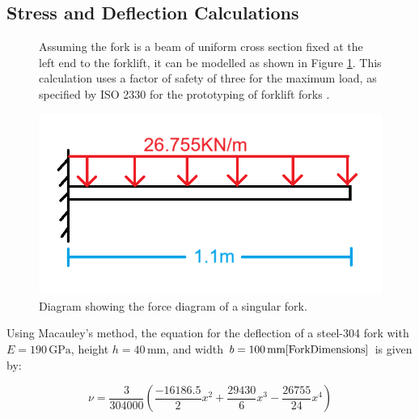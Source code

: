 \documentclass[12pt]{article}
\begin{document}
\subsection {Stress and Deflection Calculations}
\begin{figure}[H]
    \centering
    \begin{minipage}[t]{0.5\textwidth}
        \vspace{0pt}
        \linespread{1.5}
        Assuming the fork is a beam of uniform cross section fixed at the left end to the forklift, it can be modelled as shown in Figure \ref{fig:x}. This calculation uses a factor of safety of three for the maximum load, as specified by ISO 2330 for the prototyping of forklift forks \cite{iso2330}.
    \end{minipage}%
    \hfill
    \begin{minipage}[t]{0.45\textwidth}
        \vspace{-32pt} 
        \centering
        \includegraphics[width=\linewidth]{fork as a beam diagram.png}
        \vspace{-40pt}
        \caption{Diagram showing the force diagram of a singular fork.}
        \label{fig:x}
    \end{minipage}
\end{figure}


Using Macauley's method, the equation for the deflection of a steel-304 fork with \( E = 190 \, \text{GPa} \), height \( h = 40 \, \text{mm} \), and width \( b = 100 \, \text{mm} \cite{ForkDimensions} \) is given by:


\vspace{-20pt}
\begin{equation}
   \nu = \frac{3}{304000} \left( \frac{-16186.5}{2}x^2 + \frac{29430}{6}x^3 - \frac{26755}{24}x^4 \right)
\end{equation}
\vspace{-20pt}
\end{document}
